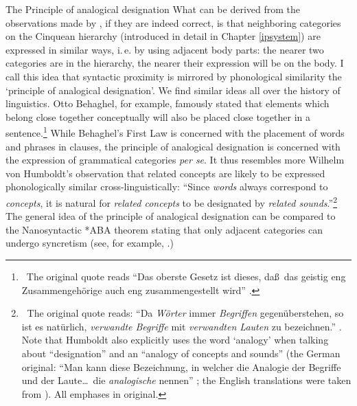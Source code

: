 \begin{savenotes}
\begin{digression}{The Principle of analogical designation}{}
\noindent What\label{analogicaldesignation} can be derived from the observations made by \citet{bross2017scope}, if they are indeed correct, is that neighboring categories on the Cinquean hierarchy (introduced in detail in Chapter \ref{ipsystem}) are expressed in similar ways, i.\,e. by using adjacent body parts: the nearer two categories are in the hierarchy, the nearer their expression will be on the body. I call this idea that syntactic proximity is mirrored by phonological similarity the `principle of analogical designation'. We find similar ideas all over the history of linguistics. Otto Behaghel, for example, famously stated that elements which belong close together conceptually will also be placed close together in a sentence.\footnote{ \, The original quote reads ``Das oberste Gesetz ist dieses, da\ss\ das geistig eng Zusammengehörige auch eng zusammengestellt wird'' \citep[4]{behaghel1932}.} While Behaghel's First Law is concerned with the placement of words and phrases in clauses, the principle of analogical designation is concerned with the expression of grammatical categories \textit{per se}. It thus resembles more Wilhelm von Humboldt's observation that related concepts are likely to be expressed phonologically similar cross-linguistically: ``Since \textit{words} always correspond to \textit{concepts}, it is natural for \textit{related concepts} to be designated by \textit{related sounds}.''\footnote{ \textcolor{white}{n}The original quote reads: ``Da \textit{Wörter} immer \textit{Begriffen} gegenüberstehen, so ist es natürlich, \textit{verwandte Begriffe} mit \textit{verwandten Lauten} zu bezeichnen.'' \citep[75]{von1836kawi}. Note that Humboldt also explicitly uses the word `analogy' when talking about ``designation'' and an ``analogy of concepts and sounds'' (the German original: ``Man kann diese Bezeichnung, in welcher die Analogie der Begriffe und der Laute\dots\ die \textit{analogische} nennen'' \citealt[81]{von1836kawi}; the English translations were taken from \citealt{humboldt1999language}). All emphases in original. } The general idea of the principle of analogical designation can be compared to the Nanosyntactic *ABA theorem stating that only adjacent categories can undergo syncretism (see, for example, \citealt{bobalji2007comparative,bobalji2012universals,caha2009nanosyntax}.)


\end{digression}
\end{savenotes}
